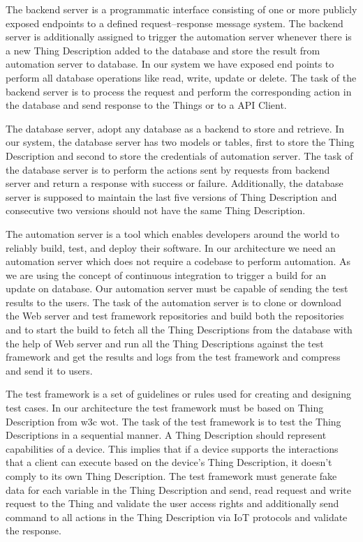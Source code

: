 \documentclass[conference]{IEEEtran}
\theoremstyle{definition}
\begin{document}
The backend server is a programmatic interface consisting of one or more publicly exposed endpoints to a defined request–response message system. 
The backend server is additionally assigned to trigger the automation server whenever there is a new Thing Description added to the database and store the result from automation server to database.
In our system we have exposed end points to perform all database operations like read, write, update or delete. 
The task of the backend server is to process the request and perform the corresponding action in the database and send response to the Things or to a API Client.

The database server, adopt any database as a backend to store and retrieve.  
In our system, the database server has two models or tables, first to store the Thing Description and second to store the credentials of automation server. 
The task of the database server is to perform the actions sent by requests from backend server and return a response with success or failure. 
Additionally, the database server is supposed to maintain the last five versions of Thing Description and consecutive two versions should not have the same Thing Description. 

The automation server is a tool which enables developers around the world to reliably build, test, and deploy their software. 
In our architecture we need an automation server which does not require a codebase to perform automation. 
As we are using the concept of continuous integration to trigger a build for an update on database. 
Our automation server must be capable of sending the test results to the users. 
The task of the automation server is to clone or download the Web server and test framework repositories and build both the repositories and 
to start the build to fetch all the Thing Descriptions from the database with the help of Web server and 
run all the Thing Descriptions against the test framework and 
get the results and logs from the test framework and compress and send it to users.

The test framework is a set of guidelines or rules used for creating and designing test cases. 
In our architecture the test framework must be based on Thing Description from \ac{w3c} \ac{wot}. 
The task of the test framework is to test the Thing Descriptions in a sequential manner. 
A Thing Description should represent capabilities of a device. 
This implies that if a device supports the interactions that a client can execute based on the device's Thing Description, it doesn't comply to its own Thing Description. 
The test framework must generate fake data for each variable in the Thing Description and send, read request and write request to the Thing and validate the user access rights and additionally send command to all actions in the Thing Description via IoT protocols and validate the response. 
\end{document}
